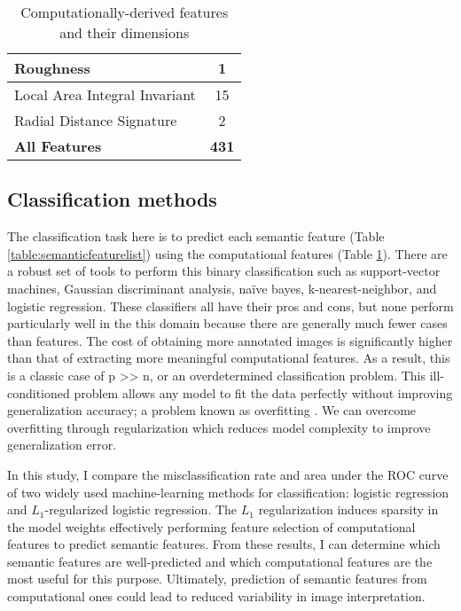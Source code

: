 \begin{table}
\begin{tabular}{|l|c|}
		\hspace{2pt} Roughness & 1\\ \hline
		\hspace{2pt} Local Area Integral Invariant & 15\\ \hline
		\hspace{2pt} Radial Distance Signature & 2\\ \hline \hline
		\textbf{All Features} & \textbf{431} \\ \hline
	\end{tabular}
	\caption{Computationally-derived features and their dimensions}
	\label{table:compfeaturelist}
\end{table}

\subsection{Classification methods}
The classification task here is to predict each semantic feature (Table \ref{table:semanticfeaturelist}) using the computational features (Table \ref{table:compfeaturelist}).
There are a robust set of tools to perform this binary classification such as support-vector machines, Gaussian discriminant analysis, na\"{i}ve bayes, k-nearest-neighbor, and logistic regression.
These classifiers all have their pros and cons, but none perform particularly well in the this domain because there are generally much fewer cases than features.
The cost of obtaining more annotated images is significantly higher than that of extracting more meaningful computational features.
As a result, this is a classic case of p >> n, or an overdetermined classification problem.
This ill-conditioned problem allows any model to fit the data perfectly without improving generalization accuracy; a problem known as overfitting \cite{Hastie:2009wp,Friedman:2009wm}.
We can overcome overfitting through regularization which reduces model complexity to improve generalization error.

In this study, I compare the misclassification rate and area under the ROC curve of two widely used machine-learning methods for classification: logistic regression and $L_1$-regularized logistic regression.
The $L_1$ regularization induces sparsity in the model weights effectively performing feature selection of computational features to predict semantic features.
From these results, I can determine which semantic features are well-predicted and which computational features are the most useful for this purpose.
Ultimately, prediction of semantic features from computational ones could lead to reduced variability in image interpretation.

